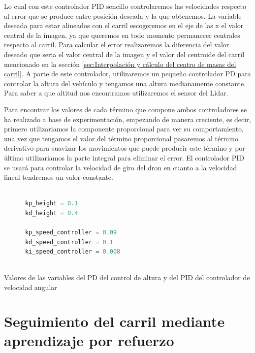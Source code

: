   Lo cual con este controlador PID sencillo controlaremos las velocidades respecto al error que se produce entre posición deseada y la que obtenemos. La variable deseada para estar alineados con el carril escogeremos 
  en el eje de las x el valor central de la imagen, ya que queremos en todo momento permanecer centrales respecto al carril. Para calcular el error realizaremos la diferencia del valor deseado que seria 
  el valor central de la imagen y el valor del centroide del carril mencionado en la sección \ref{sec:Interpolación y cálculo del centro de masas del carril}. 
  A parte de este controlador, utilizaremos un pequeño controlador PD para controlar la altura del vehículo y tengamos una altura medianamente constante. Para saber a que altitud nos encontramos utilizaremos el sensor del Lidar. \newline

  Para encontrar los valores de cada término que compone ambos controladores se ha realizado a base de experimentación, empezando de manera creciente, es decir, primero utilizariamos
  la componente proporcional para ver su comportamiento, una vez que tengamos el valor del término proporcional pasaremos al término derivativo para suavizar los movimientos que puede
  producir este término y por último utilizariamos la parte integral para eliminar el error. El controlador PID se usará para controlar la velocidad de giro del dron en cuanto a la velocidad lineal 
  tendremos un valor constante. \newline

  \begin{code}[h]
    \begin{lstlisting}[language=Python]

      kp_height = 0.1
      kd_height = 0.4

      kp_speed_controller = 0.09
      kd_speed_controller = 0.1
      ki_speed_controller = 0.008
     
    \end{lstlisting}
    \caption[Valores de las variables del PD del control de altura y del PID del controlador de velocidad angular]{Valores de las variables del PD del control de altura y del PID del controlador de velocidad angular}
    \label{cod:codejemplo}
    \end{code} 

  \section{Seguimiento del carril mediante aprendizaje por refuerzo}
  \label{sec:aprendizaje por refuerzo}

